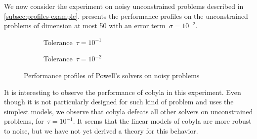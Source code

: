 We now consider the experiment on noisy unconstrained problems described in \cref{subsec:profiles-example}.
 presents the performance profiles on the unconstrained problems of dimension at most \num{50} with an error term~$\sigma = 10^{-2}$.

\begin{figure}[ht]
    \centering
    \begin{subfigure}[b]{0.49\textwidth}
        \centering
        \caption{Tolerance~$\tau = 10^{-1}$}
    \end{subfigure}
    \hfill
    \begin{subfigure}[b]{0.49\textwidth}
        \centering
        \caption{Tolerance~$\tau = 10^{-2}$}
    \end{subfigure}
    \caption{Performance profiles of Powell's  solvers on noisy problems}
    \label{fig:ppun-50}
\end{figure}

It is interesting to observe the performance of \gls{cobyla} in this experiment.
Even though it is not particularly designed for such kind of problem and uses the simplest models, we observe that \gls{cobyla} defeats all other solvers on unconstrained problems, for~$\tau = 10^{-1}$.
It seems that the linear models of \gls{cobyla} are more robust to noise, but we have not yet derived a theory for this behavior.

